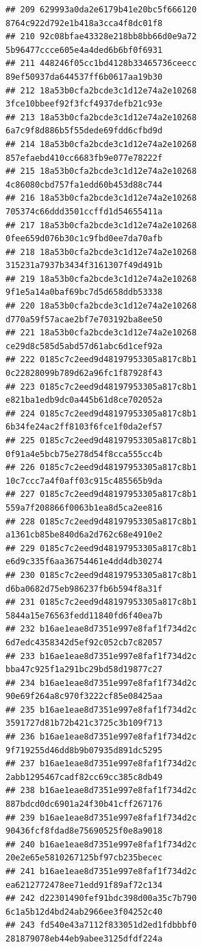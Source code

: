 \documentclass[]{article}
\begin{document}
\begin{verbatim}
## 209 629993a0da2e6179b41e20bc5f666120   8764c922d792e1b418a3cca4f8dc01f8
## 210 92c08bfae43328e218bb8bb66d0e9a72   5b96477ccce605e4a4ded6b6bf0f6931
## 211 448246f05cc1bd4128b33465736ceecc   89ef50937da644537ff6b0617aa19b30
## 212 18a53b0cfa2bcde3c1d12e74a2e10268   3fce10bbeef92f3fcf4937defb21c93e
## 213 18a53b0cfa2bcde3c1d12e74a2e10268   6a7c9f8d886b5f55dede69fdd6cfbd9d
## 214 18a53b0cfa2bcde3c1d12e74a2e10268   857efaebd410cc6683fb9e077e78222f
## 215 18a53b0cfa2bcde3c1d12e74a2e10268   4c86080cbd757fa1edd60b453d88c744
## 216 18a53b0cfa2bcde3c1d12e74a2e10268   705374c66ddd3501ccffd1d54655411a
## 217 18a53b0cfa2bcde3c1d12e74a2e10268   0fee659d076b30c1c9fbd0ee7da70afb
## 218 18a53b0cfa2bcde3c1d12e74a2e10268   315231a7937b3434f3161307f49d491b
## 219 18a53b0cfa2bcde3c1d12e74a2e10268   9f1e5a14a0baf69bc7d5d658ddb53338
## 220 18a53b0cfa2bcde3c1d12e74a2e10268   d770a59f57acae2bf7e703192ba8ee50
## 221 18a53b0cfa2bcde3c1d12e74a2e10268   ce29d8c585d5abd57d61abc6d1cef92a
## 222 0185c7c2eed9d48197953305a817c8b1   0c22828099b789d62a96fc1f87928f43
## 223 0185c7c2eed9d48197953305a817c8b1   e821ba1edb9dc0a445b61d8ce702052a
## 224 0185c7c2eed9d48197953305a817c8b1   6b34fe24ac2ff8103f6fce1f0da2ef57
## 225 0185c7c2eed9d48197953305a817c8b1   0f91a4e5bcb75e278d54f8cca555cc4b
## 226 0185c7c2eed9d48197953305a817c8b1   10c7ccc7a4f0aff03c915c485565b9da
## 227 0185c7c2eed9d48197953305a817c8b1   559a7f208866f0063b1ea8d5ca2ee816
## 228 0185c7c2eed9d48197953305a817c8b1   a1361cb85be840d6a2d762c68e4910e2
## 229 0185c7c2eed9d48197953305a817c8b1   e6d9c335f6aa36754461e4dd4db30274
## 230 0185c7c2eed9d48197953305a817c8b1   d6ba0682d75eb986237fb6b594f8a31f
## 231 0185c7c2eed9d48197953305a817c8b1   5844a15e76563fedd11840fd6f40ea7b
## 232 b16ae1eae8d7351e997e8faf1f734d2c   6d7edc4358342d5ef92c052cb7c82057
## 233 b16ae1eae8d7351e997e8faf1f734d2c   bba47c925f1a291bc29bd58d19877c27
## 234 b16ae1eae8d7351e997e8faf1f734d2c   90e69f264a8c970f3222cf85e08425aa
## 235 b16ae1eae8d7351e997e8faf1f734d2c   3591727d81b72b421c3725c3b109f713
## 236 b16ae1eae8d7351e997e8faf1f734d2c   9f719255d46dd8b9b07935d891dc5295
## 237 b16ae1eae8d7351e997e8faf1f734d2c   2abb1295467cadf82cc69cc385c8db49
## 238 b16ae1eae8d7351e997e8faf1f734d2c   887bdcd0dc6901a24f30b41cff267176
## 239 b16ae1eae8d7351e997e8faf1f734d2c   90436fcf8fdad8e75690525f0e8a9018
## 240 b16ae1eae8d7351e997e8faf1f734d2c   20e2e65e5810267125bf97cb235becec
## 241 b16ae1eae8d7351e997e8faf1f734d2c   ea6212772478ee71edd91f89af72c134
## 242 d22301490fef91bdc398d00a35c7b790   6c1a5b12d4bd24ab2966ee3f04252c40
## 243 fd540e43a7112f833051d2ed1fdbbbf0   281879078eb44eb9abee3125dfdf224a

\end{verbatim}
\end{document}
